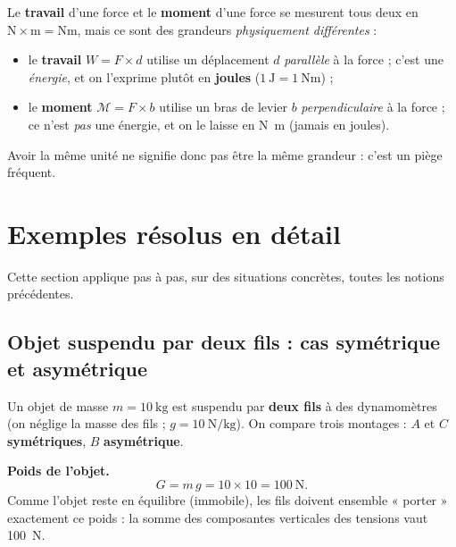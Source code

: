 \documentclass[11pt,a4paper]{article}
\newcommand{\Mom}{\mathcal{M}}      %
\begin{document}
\begin{remarque}
Le \textbf{travail} d'une force et le \textbf{moment} d'une force se mesurent tous deux en
$\si{\newton}\times\si{\metre}=\si{\newton\metre}$, mais ce sont des grandeurs \emph{physiquement
différentes} :
\begin{itemize}[leftmargin=1.6em,topsep=2pt,itemsep=1.5pt]
  \item le \textbf{travail} $W = F\times d$ utilise un déplacement $d$ \emph{parallèle} à la force ; c'est
        une \emph{énergie}, et on l'exprime plutôt en \textbf{joules} ($\SI{1}{\joule}=\SI{1}{\newton\metre}$) ;
  \item le \textbf{moment} $\Mom = F\times b$ utilise un bras de levier $b$ \emph{perpendiculaire} à la
        force ; ce n'est \emph{pas} une énergie, et on le laisse en \si{\newton\metre} (jamais en joules).
\end{itemize}
Avoir la même unité ne signifie donc pas être la même grandeur : c'est un piège fréquent.
\end{remarque}

\section{Exemples résolus en détail}
Cette section applique pas à pas, sur des situations concrètes, toutes les notions précédentes.

\subsection{Objet suspendu par deux fils : cas symétrique et asymétrique}
\begin{exemple}
Un objet de masse $m=\SI{10}{\kilogram}$ est suspendu par \textbf{deux fils} à des dynamomètres
(on néglige la masse des fils ; $g=\SI{10}{\newton\per\kilogram}$). On compare trois montages : $A$ et
$C$ \textbf{symétriques}, $B$ \textbf{asymétrique}.

\smallskip
\textbf{Poids de l'objet.}
\[
G = m\,g = 10 \times 10 = \SI{100}{\newton}.
\]
Comme l'objet reste en équilibre (immobile), les fils doivent ensemble « porter » exactement ce
poids : la somme des composantes verticales des tensions vaut \SI{100}{\newton}.
\end{exemple}
\end{document}
